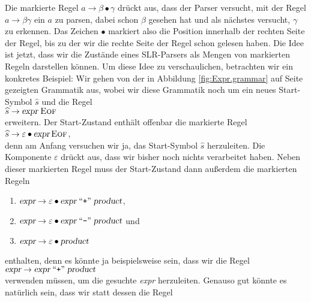 \noindent
Die markierte Regel $a \rightarrow \beta \bullet \gamma$ dr\"uckt aus, dass der Parser versucht,
mit der Regel $a \rightarrow \beta \gamma$ ein $a$ zu parsen, dabei schon $\beta$ gesehen
hat und als n\"achstes versucht, $\gamma$ zu erkennen.  Das Zeichen $\bullet$ markiert also die
Position innerhalb der rechten Seite der Regel, bis zu der wir die rechte Seite der Regel
schon gelesen haben.
Die Idee ist jetzt, dass wir die Zust\"ande eines SLR-Parsers als Mengen von markierten Regeln
darstellen k\"onnen.  Um diese Idee zu verschaulichen, betrachten wir ein konkretes Beispiel:
Wir gehen von der in Abbildung \ref{fig:Expr.grammar} auf Seite \pageref{fig:Expr.grammar}
gezeigten Grammatik aus, wobei wir diese Grammatik noch um ein neues Start-Symbol $\widehat{s}$
und die Regel
\\[0.2cm]
\hspace*{1.3cm} $\widehat{s} \rightarrow  \textsl{expr}\;\textsc{Eof}$
\\[0.2cm]
erweitern.  Der Start-Zustand enth\"alt offenbar die markierte Regel
\\[0.2cm]
\hspace*{1.3cm} $\widehat{s} \rightarrow \varepsilon \bullet \textsl{expr}\, \textsc{Eof}$,
\\[0.2cm]
denn am Anfang versuchen wir ja, das Start-Symbol $\widehat{s}$ herzuleiten.  Die Komponente
$\varepsilon$ dr\"uckt aus, dass wir bisher noch nichts verarbeitet haben.  Neben dieser
markierten Regel muss der Start-Zustand dann au{\ss}erdem die markierten Regeln
\begin{enumerate}
\item $\textsl{expr} \rightarrow \varepsilon \bullet \textsl{expr} \;\mbox{``\texttt{+}''}\; \textsl{product}$,
\item $\textsl{expr} \rightarrow \varepsilon \bullet \textsl{expr} \;\mbox{``\texttt{-}''}\; \textsl{product}$
      \qquad und
\item $\textsl{expr} \rightarrow \varepsilon \bullet \textsl{product}$
\end{enumerate}
enthalten, denn es k\"onnte ja beispielsweise sein, dass wir die Regel
\\[0.2cm]
\hspace*{1.3cm}
$\textsl{expr} \rightarrow \textsl{expr} \;\mbox{``\texttt{+}''}\; \textsl{product}$
\\[0.2cm]  
verwenden m\"ussen, um die gesuchte \textsl{expr} herzuleiten.  Genauso gut k\"onnte es nat\"urlich sein,
dass wir statt dessen die Regel
\\[0.2cm]
\hspace*{1.3cm}
